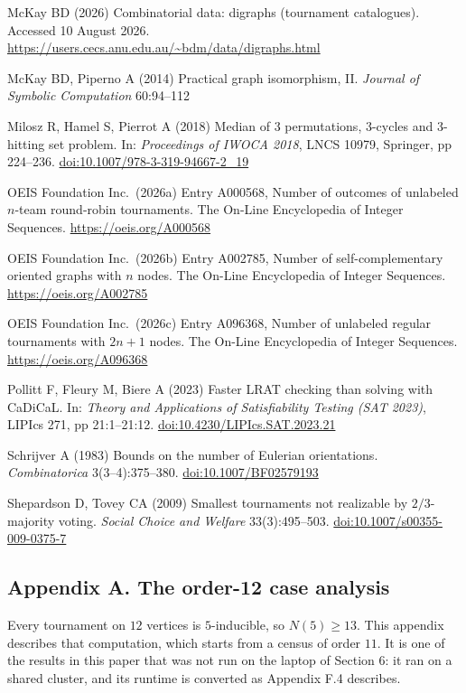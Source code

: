 \documentclass[
]{article}
\begin{document}
McKay BD (2026) Combinatorial data: digraphs (tournament catalogues).
Accessed 10 August 2026.
\url{https://users.cecs.anu.edu.au/~bdm/data/digraphs.html}

McKay BD, Piperno A (2014) Practical graph isomorphism, II.
\emph{Journal of Symbolic Computation} 60:94--112

Milosz R, Hamel S, Pierrot A (2018) Median of 3 permutations, 3-cycles
and 3-hitting set problem. In: \emph{Proceedings of IWOCA 2018}, LNCS
10979, Springer, pp 224--236. \url{doi:10.1007/978-3-319-94667-2_19}

OEIS Foundation Inc.~(2026a) Entry A000568, Number of outcomes of
unlabeled \(n\)-team round-robin tournaments. The On-Line Encyclopedia
of Integer Sequences. \url{https://oeis.org/A000568}

OEIS Foundation Inc.~(2026b) Entry A002785, Number of self-complementary
oriented graphs with \(n\) nodes. The On-Line Encyclopedia of Integer
Sequences. \url{https://oeis.org/A002785}

OEIS Foundation Inc.~(2026c) Entry A096368, Number of unlabeled regular
tournaments with \(2n+1\) nodes. The On-Line Encyclopedia of Integer
Sequences. \url{https://oeis.org/A096368}

Pollitt F, Fleury M, Biere A (2023) Faster LRAT checking than solving
with CaDiCaL. In: \emph{Theory and Applications of Satisfiability
Testing (SAT 2023)}, LIPIcs 271, pp 21:1--21:12.
\url{doi:10.4230/LIPIcs.SAT.2023.21}

Schrijver A (1983) Bounds on the number of Eulerian orientations.
\emph{Combinatorica} 3(3--4):375--380. \url{doi:10.1007/BF02579193}

Shepardson D, Tovey CA (2009) Smallest tournaments not realizable by
\(2/3\)-majority voting. \emph{Social Choice and Welfare}
33(3):495--503. \url{doi:10.1007/s00355-009-0375-7}

\setcounter{table}{0}\setcounter{figure}{0}

\subsection{Appendix A. The order-12 case
analysis}\label{appendix-a.-the-order-12-case-analysis}

Every tournament on \(12\) vertices is \(5\)-inducible, so
\(N(5) \ge 13\). This appendix describes that computation, which starts
from a census of order \(11\). It is one of the results in this paper
that was not run on the laptop of Section 6: it ran on a shared cluster,
and its runtime is converted as Appendix F.4 describes.
\end{document}
